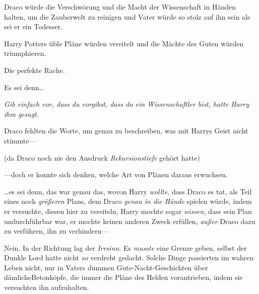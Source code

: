 Draco würde die Verschwörung und die Macht der Wissenschaft in Händen halten, um die Zauberwelt zu reinigen und Vater würde so stolz auf ihn sein als sei er ein Todesser.

Harry Potters üble Pläne würden vereitelt und die Mächte des Guten würden triumphieren.

Die perfekte Rache.

Es sei denn…

\emph{Gib einfach vor, dass du vorgibst, dass du ein Wissenschaftler bist, hatte Harry ihm gesagt.}

Draco fehlten die Worte, um genau zu beschreiben, was mit Harrys Geist nicht stimmte—

(da Draco noch nie den Ausdruck \emph{Rekursionstiefe} gehört hatte)

—doch er konnte sich denken, welche Art von Plänen daraus erwuchsen.

…es sei denn, das war genau das, wovon Harry \emph{wollte}, dass Draco es tat, als Teil eines noch \emph{größeren} Plans, dem Draco \emph{genau in die Hände} spielen würde, indem er versuchte, diesen hier zu vereiteln, Harry mochte sogar \emph{wissen}, dass sein Plan undurchführbar war, er mochte keinen anderen Zweck erfüllen, \emph{außer} Draco dazu zu verführen, ihn zu verhindern—

Nein. In der Richtung lag der \emph{Irrsinn}. Es \emph{musste} eine Grenze geben, selbst der Dunkle Lord hatte nicht \emph{so} verdreht gedacht. Solche Dinge passierten im wahren Leben nicht, nur in Vaters dummen Gute-Nacht-Geschichten über dämlicheBetonköpfe, die immer die Pläne des Helden vorantrieben, indem sie versuchten ihn aufzuhalten.

